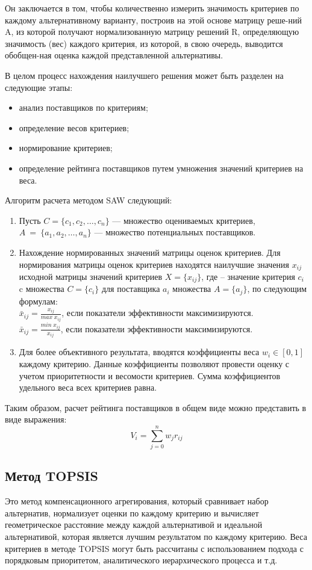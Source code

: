 Он заключается в том, чтобы количественно измерить значимость
критериев по каждому альтернативному варианту, построив на этой основе
матрицу реше-ний A, из которой получают нормализованную матрицу решений R,
определяющую значимость (вес) каждого критерия, из которой, в свою очередь,
выводится обобщен-ная оценка каждой представленной альтернативы.

В целом процесс нахождения наилучшего решения может быть разделен на
следующие этапы:
\begin{itemize}
	\item анализ поставщиков по критериям;
	\item определение весов критериев;
	\item нормирование критериев;
	\item определение рейтинга поставщиков путем умножения
		значений критериев на веса.
\end{itemize}

Алгоритм расчета методом SAW следующий:
\begin{enumerate}
	\item Пусть \(C = \{c_1, c_2, \ldots, c_n\}\) --- множество
		оцениваемых критериев, \(A~=~\{a_1, a_2, \ldots, a_n\}\) --- множество
		потенциальных поставщиков. 
	\item Нахождение нормированных значений матрицы оценок критериев.
		Для нормирования матрицы оценок критериев находятся наилучшие
		значения \(x_{ij}\) исходной матрицы значений критериев
		\(X = \{x_{ij}\}\), где – значение критерия \(c_i\)
		c множества \(C=\{c_i\}\) для поставщика \(a_i\) множества
		\(A = \{a_j\}\), по следующим формулам:\\
		\(\bar x_{ij} = \frac{x_{ij}}{max\;x_{ij}}\), 
		если показатели эффективности максимизируются.\\
		\(\bar x_{ij} = \frac{min\;x_{ij}}{x_{ij}}\), 
		если показатели эффективности максимизируются.
	\item Для более объективного результата, вводятся коэффициенты веса
		\(w_i \in [0,1]\) каждому критерию. Данные коэффициенты позволяют
		провести оценку с учетом приоритетности и весомости критериев.
		Сумма коэффициентов удельного веса всех критериев равна.
\end{enumerate}

Таким образом, расчет рейтинга поставщиков в общем виде можно
представить в виде выражения:
\[V_i = \sum_{j=0}^{n} w_j r_{ij}\]

\subsection{Метод TOPSIS}
Это метод компенсационного агрегирования, который сравнивает набор
альтернатив, нормализует оценки по каждому критерию и вычисляет
геометрическое расстояние между каждой альтернативой и идеальной
альтернативой, которая является лучшим результатом по каждому критерию.
Веса критериев в методе TOPSIS могут быть рассчитаны с использованием
подхода с порядковым приоритетом, аналитического иерархического процесса и т.д.


